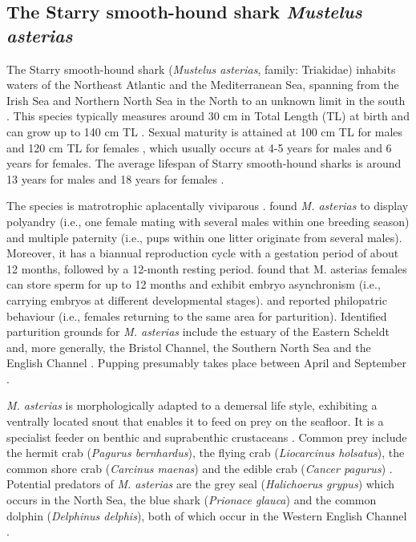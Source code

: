 \documentclass[
  authoryear,
  review,
  3p]{elsarticle}
\begin{document}
\hypertarget{the-starry-smooth-hound-shark-mustelus-asterias}{%
\subsection{\texorpdfstring{The Starry smooth-hound shark \emph{Mustelus
asterias}}{The Starry smooth-hound shark Mustelus asterias}}\label{the-starry-smooth-hound-shark-mustelus-asterias}}

The Starry smooth-hound shark (\emph{Mustelus asterias}, family:
Triakidae) inhabits waters of the Northeast Atlantic and the
Mediterranean Sea, spanning from the Irish Sea and Northern North Sea in
the North to an unknown limit in the south \citep{ices_2022}. This
species typically measures around 30 cm in Total Length (TL) at birth
and can grow up to 140 cm TL \citep{mccullyphillips_2015}. Sexual
maturity is attained at 100 cm TL for males and 120 cm TL for females
\citep{farrell_2010}, which usually occurs at 4-5 years for males and 6
years for females. The average lifespan of Starry smooth-hound sharks is
around 13 years for males and 18 years for females \citep{farrell_2010}.

\newpage{}

The species is matrotrophic aplacentally viviparous \citep[i.e., embryos
absorb nutrients from a yolk sack that is used up during
gestation,][]{farrell_2010a, mccullyphillips_2015}. \citet{farrell_2014}
found \emph{M. asterias} to display polyandry (i.e., one female mating
with several males within one breeding season) and multiple paternity
(i.e., pups within one litter originate from several males). Moreover,
it has a biannual reproduction cycle with a gestation period of about 12
months, followed by a 12-month resting period. \citet{farrell_2010a}
found that M. asterias females can store sperm for up to 12 months and
exhibit embryo asynchronism (i.e., carrying embryos at different
developmental stages). \citet{breve_2016} and \citet{griffiths_2020}
reported philopatric behaviour (i.e., females returning to the same area
for parturition). Identified parturition grounds for \emph{M. asterias}
include the estuary of the Eastern Scheldt and, more generally, the
Bristol Channel, the Southern North Sea and the English Channel
\citep{dureuil_2013, mccullyphillips_2015, breve_2016}. Pupping
presumably takes place between April and September
\citep{farrell_2010a, mccullyphillips_2015}.

\emph{M. asterias} is morphologically adapted to a demersal life style,
exhibiting a ventrally located snout that enables it to feed on prey on
the seafloor. It is a specialist feeder on benthic and suprabenthic
crustaceans \citep{mccullyphillips_2020, bitonporsmoguer_2022}. Common
prey include the hermit crab (\emph{Pagurus bernhardus}), the flying
crab (\emph{Liocarcinus holsatus}), the common shore crab
(\emph{Carcinus maenas}) and the edible crab (\emph{Cancer pagurus})
\citep{mccullyphillips_2015, mccullyphillips_2020}. Potential predators
of \emph{M. asterias} are the grey seal (\emph{Halichoerus grypus})
which occurs in the North Sea, the blue shark (\emph{Prionace glauca})
and the common dolphin (\emph{Delphinus delphis}), both of which occur
in the Western English Channel \citep{griffiths_2020}.
\end{document}
